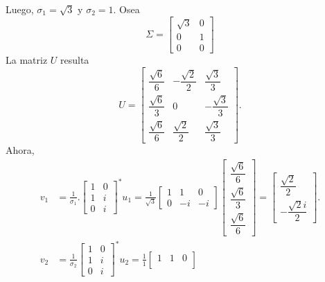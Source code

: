 \begin{frame}
	\begin{solution}
		Luego, $\sigma_{1}=\sqrt{3}$ y $\sigma_{2}=1$.
		Osea
		\begin{equation*}
			\Sigma=
			\begin{bmatrix}
				\sqrt{3} & 0 \\
				0        & 1 \\
				0        & 0
			\end{bmatrix}
		\end{equation*}
		La matriz $U$ resulta
		\begin{equation*}
			U=
			\begin{bmatrix}
				\dfrac{\sqrt{6}}{6} & -\dfrac{\sqrt{2}}{2} & \dfrac{\sqrt{3}}{3}  \\
				\dfrac{\sqrt{6}}{3} & 0                    & -\dfrac{\sqrt{3}}{3} \\
				\dfrac{\sqrt{6}}{6} & \dfrac{\sqrt{2}}{2}  & \dfrac{\sqrt{3}}{3}
			\end{bmatrix}.
		\end{equation*}
		Ahora,
		\begin{align*}
			v_{1} & =
			\frac{1}{\sigma_{1}}.
			{\begin{bmatrix}
				 1 & 0 \\
				 1 & i \\
				 0 & i
			 \end{bmatrix}}^{\ast}
			u_{1}=
			\frac{1}{\sqrt{3}}
			\begin{bmatrix}
				1 & 1  & 0  \\
				0 & -i & -i
			\end{bmatrix}
			\begin{bmatrix}
				\dfrac{\sqrt{6}}{6} \\
				\dfrac{\sqrt{6}}{3} \\
				\dfrac{\sqrt{6}}{6}
			\end{bmatrix}=
			\begin{bmatrix}
				\dfrac{\sqrt{2}}{2} \\
				-\dfrac{\sqrt{2}i}{2}
			\end{bmatrix}. \\
			v_{2} & =
			\frac{1}{\sigma_{2}}
			{\begin{bmatrix}
					 1 & 0 \\
					 1 & i \\
					 0 & i
				 \end{bmatrix}}^{\ast}
			u_{2}=
			\frac{1}{1}
			\begin{bmatrix}
				1 & 1  & 0  \\

\end{bmatrix}
\end{align*}
\end{solution}
\end{frame}
